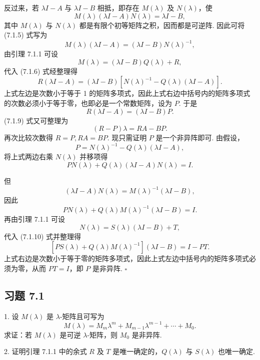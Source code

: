 \documentclass[UTF8, 12pt, fontset=fandol, oneside]{ctexart}
\begin{document}
反过来，若 $\lambda I-A$ 与 $\lambda I-B$ 相抵，即存在 $M(\lambda)$ 及 $N(\lambda)$，使
\begin{equation}
M(\lambda)(\lambda I-A)N(\lambda)=\lambda I-B,
\tag{7.1.5}
\end{equation}
其中 $M(\lambda)$ 与 $N(\lambda)$ 都是有限个初等矩阵之积，因而都是可逆阵. 因此可将 (7.1.5) 式写为
\begin{equation}
M(\lambda)(\lambda I-A)=(\lambda I-B)N(\lambda)^{-1},
\tag{7.1.6}
\end{equation}
由引理 7.1.1 可设
\begin{equation}
M(\lambda)=(\lambda I-B)Q(\lambda)+R,
\tag{7.1.7}
\end{equation}
代入 (7.1.6) 式经整理得
\begin{equation}
R(\lambda I-A)=(\lambda I-B)\left[N(\lambda)^{-1}-Q(\lambda)(\lambda I-A)\right].
\tag{7.1.8}
\end{equation}
上式左边是次数小于等于 1 的矩阵多项式，因此上式右边中括号内的矩阵多项式的次数必须小于等于零，也即必是一个常数矩阵，设为 $P$. 于是
\begin{equation}
R(\lambda I-A)=(\lambda I-B)P.
\tag{7.1.9}
\end{equation}
(7.1.9) 式又可整理为
\[
(R-P)\lambda=RA-BP.
\]
再次比较次数得 $R=P,RA=BP$. 现只需证明 $P$ 是一个非异阵即可. 由假设，
\[
P=N(\lambda)^{-1}-Q(\lambda)(\lambda I-A),
\]
将上式两边右乘 $N(\lambda)$ 并移项得
\[
PN(\lambda)+Q(\lambda)(\lambda I-A)N(\lambda)=I.
\]

但
\[
(\lambda I-A)N(\lambda)=M(\lambda)^{-1}(\lambda I-B),
\]
因此
\begin{equation}
PN(\lambda)+Q(\lambda)M(\lambda)^{-1}(\lambda I-B)=I.
\tag{7.1.10}
\end{equation}
再由引理 7.1.1 可设
\[
N(\lambda)=S(\lambda)(\lambda I-B)+T,
\]
代入 (7.1.10) 式并整理得
\[
\left[PS(\lambda)+Q(\lambda)M(\lambda)^{-1}\right](\lambda I-B)=I-PT.
\]
上式右边是次数小于等于零的矩阵多项式，因此上式左边中括号内的矩阵多项式必须为零，从而 $PT=I$，即 $P$ 是非异阵. $\square$

\subsection*{习题 7.1}

1. 设 $M(\lambda)$ 是 $\lambda$-矩阵且可写为
\[
M(\lambda)=M_m\lambda^m+M_{m-1}\lambda^{m-1}+\cdots+M_0.
\]
求证：若 $M(\lambda)$ 是可逆 $\lambda$-矩阵，则 $M_0$ 是非异阵.

2. 证明引理 7.1.1 中的余式 $R$ 及 $T$ 是唯一确定的，$Q(\lambda)$ 与 $S(\lambda)$ 也唯一确定.
\end{document}
